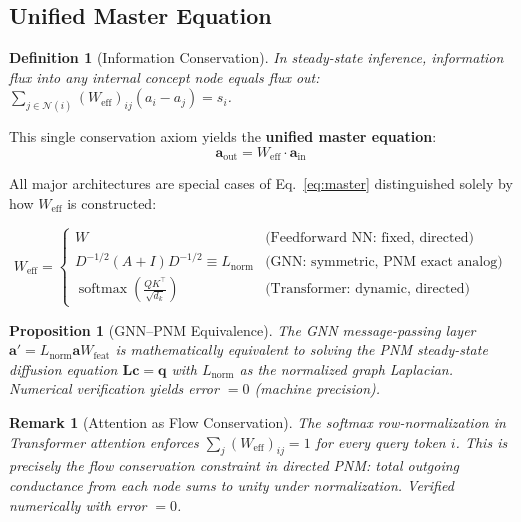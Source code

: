\documentclass[11pt,a4paper]{article}
\newtheorem{definition}{Definition}
\newtheorem{proposition}{Proposition}
\newtheorem{remark}{Remark}
\newcommand{\Weff}{W_{\text{eff}}}
\newcommand{\Lnorm}{L_{\text{norm}}}
\begin{document}
\subsection{Unified Master Equation}
\label{sec:master}

\begin{definition}[Information Conservation]
In steady-state inference, information flux into any internal concept node
equals flux out: $\sum_{j \in \mathcal{N}(i)} (\Weff)_{ij}(a_i - a_j) = s_i$.
\end{definition}

This single conservation axiom yields the \textbf{unified master equation}:
\begin{equation}
  \boxed{\mathbf{a}_{\text{out}} = \Weff \cdot \mathbf{a}_{\text{in}}}
  \label{eq:master}
\end{equation}

All major architectures are special cases of Eq.~\eqref{eq:master}
distinguished solely by how $\Weff$ is constructed:

\begin{equation}
  \Weff = \begin{cases}
    W & \text{(Feedforward NN: fixed, directed)} \\[4pt]
    D^{-1/2}(A+I)D^{-1/2} \equiv \Lnorm & \text{(GNN: symmetric, PNM exact analog)} \\[4pt]
    \operatorname{softmax}\!\left(\frac{QK^\top}{\sqrt{d_k}}\right) & \text{(Transformer: dynamic, directed)}
  \end{cases}
  \label{eq:weff}
\end{equation}

\begin{proposition}[GNN--PNM Equivalence]
The GNN message-passing layer $\mathbf{a}' = \Lnorm \mathbf{a} W_{\text{feat}}$
is mathematically equivalent to solving the PNM steady-state diffusion equation
$\mathbf{L}\mathbf{c} = \mathbf{q}$ with $\Lnorm$ as the normalized graph
Laplacian. Numerical verification yields error $= 0$ (machine precision).
\end{proposition}

\begin{remark}[Attention as Flow Conservation]
The softmax row-normalization in Transformer attention enforces
$\sum_j (\Weff)_{ij} = 1$ for every query token $i$. This is precisely the
flow conservation constraint in directed PNM: total outgoing conductance
from each node sums to unity under normalization. Verified numerically
with error $= 0$.
\end{remark}
\end{document}
